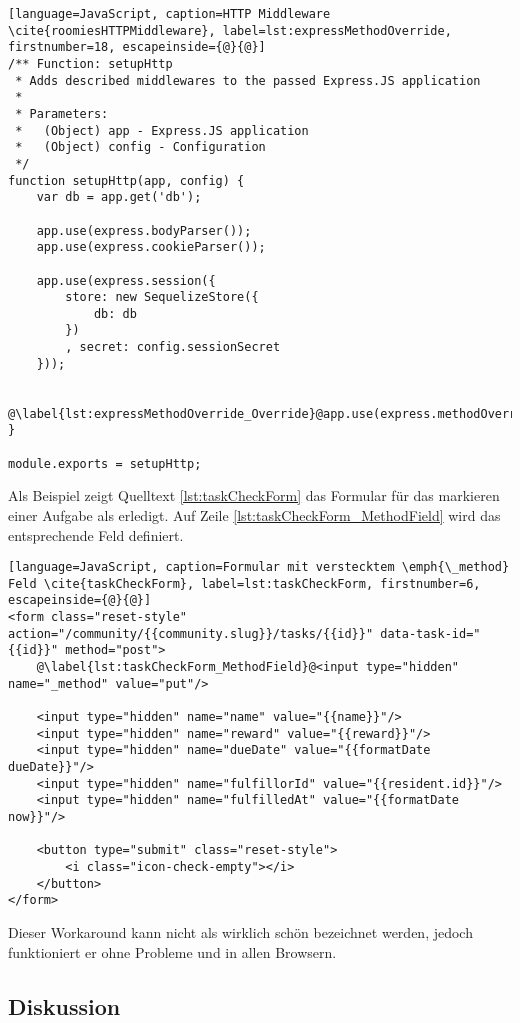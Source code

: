 \begin{lstlisting}[language=JavaScript, caption=HTTP Middleware \cite{roomiesHTTPMiddleware}, label=lst:expressMethodOverride, firstnumber=18, escapeinside={@}{@}]
/** Function: setupHttp
 * Adds described middlewares to the passed Express.JS application
 *
 * Parameters:
 *   (Object) app - Express.JS application
 *   (Object) config - Configuration
 */
function setupHttp(app, config) {
	var db = app.get('db');

	app.use(express.bodyParser());
	app.use(express.cookieParser());

	app.use(express.session({
		store: new SequelizeStore({
			db: db
		})
		, secret: config.sessionSecret
	}));

	@\label{lst:expressMethodOverride_Override}@app.use(express.methodOverride());
}

module.exports = setupHttp;
\end{lstlisting}

Als Beispiel zeigt Quelltext \ref{lst:taskCheckForm} das Formular für das markieren einer Aufgabe als erledigt. Auf Zeile \ref{lst:taskCheckForm_MethodField} wird das entsprechende Feld definiert.

\begin{lstlisting}[language=JavaScript, caption=Formular mit verstecktem \emph{\_method} Feld \cite{taskCheckForm}, label=lst:taskCheckForm, firstnumber=6, escapeinside={@}{@}]
<form class="reset-style" action="/community/{{community.slug}}/tasks/{{id}}" data-task-id="{{id}}" method="post">
	@\label{lst:taskCheckForm_MethodField}@<input type="hidden" name="_method" value="put"/>

	<input type="hidden" name="name" value="{{name}}"/>
	<input type="hidden" name="reward" value="{{reward}}"/>
	<input type="hidden" name="dueDate" value="{{formatDate dueDate}}"/>
	<input type="hidden" name="fulfillorId" value="{{resident.id}}"/>
	<input type="hidden" name="fulfilledAt" value="{{formatDate now}}"/>

	<button type="submit" class="reset-style">
		<i class="icon-check-empty"></i>
	</button>
</form>
\end{lstlisting}

Dieser Workaround kann nicht als wirklich schön bezeichnet werden, jedoch funktioniert er ohne Probleme und in allen Browsern.

\subsection*{Diskussion}

